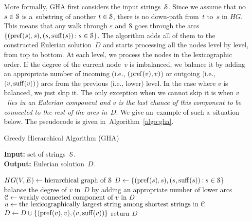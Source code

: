 More formally, GHA first considers the input
strings~${\cal S}$. Since we assume that 
no $s \in {\cal S}$ is a~substring of another 
$t \in {\cal S}$, there is no down-path from~$t$ to~$s$ in $HG$. 
This means that any walk through $\varepsilon$ and ${\cal S}$ goes through the arcs $\{(\operatorname{pref}(s), s), (s, \operatorname{suff}(s)) \colon s \in {\cal S}\}$. The algorithm adds all of them to the constructed Eulerian solution~$D$ and starts processing all the nodes level by level, from top to bottom. At each level, we process the nodes in the lexicographic order. If the degree of the current node~$v$ is imbalanced, we balance it by adding an appropriate number of incoming (i.e., $(\operatorname{pref}(v),v)$) or outgoing (i.e., $(v, \operatorname{suff}(v))$) arcs from the previous (i.e., lower) level. In the case where $v$ is balanced, we just skip it. The only exception when we cannot skip it is when {\em $v$~lies in an Eulerian component and $v$ is the last chance of this component to be connected to the rest of the arcs in~$D$}. We give an~example of such a~situation below. The pseudocode is given in~Algorithm~\ref{algo:gha}. 


\begin{algorithm}[!ht]
\caption{Greedy Hierarchical Algorithm (GHA)}\label{algo:gha}
\hspace*{\algorithmicindent} \textbf{Input:} set of strings~${\cal S}$.\\
\hspace*{\algorithmicindent} \textbf{Output:} Eulerian solution~$D$.
\begin{algorithmic}[1]
\State $HG(V,E) \gets \text{hierarchical graph of ${\cal S}$}$ 
\State\label{alg:gha_init}$D \gets \{(\operatorname{pref}(s), s), (s, \operatorname{suff}(s)) \colon s \in {\cal S}\}$
\label{alg:for}
\State\label{alg:step6} balance the degree of $v$ in~$D$ by adding an appropriate number of lower arcs
\Else
\State\label{alg:else} ${\cal C} \gets \text{weakly connected component of $v$ in $D$}$
\State $u \gets \text{the lexicographically largest string among shortest strings in ${\cal C}$}$
\State\label{alg:last} $D \gets D \cup \{(\operatorname{pref}(v), v), (v, \operatorname{suff}(v))\}$
\EndIf
\EndIf
\EndFor
\EndFor
\State return $D$
\end{algorithmic}
\end{algorithm}



